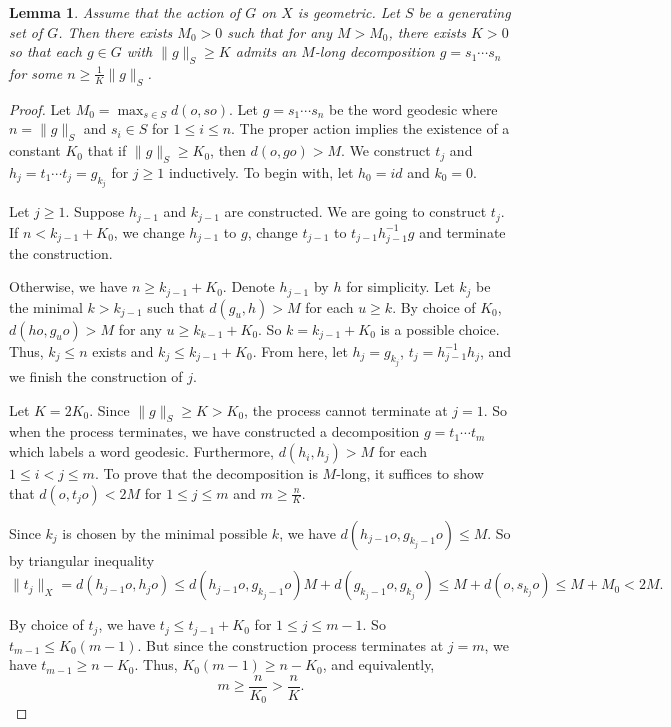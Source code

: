 \documentclass{amsart}
\numberwithin{thm}{section}
\numberwithin{figure}{section}
\newtheorem{lem}[thm]{Lemma}
\theoremstyle{definition}
\theoremstyle{definition}
\theoremstyle{remark}
\numberwithin{equation}{section}
\theoremstyle{plain}
\begin{document}
\begin{lem}\label{longDecExist} 
	Assume that the action of $G$ on $X$ is geometric. Let $S$ be a generating set of $G$. Then there exists $M_0>0$ such that for any $M>M_0$, there exists $K > 0$ so that each $g\in G$ with $\|g\|_S\ge K$ admits an $M$-long decomposition $g = s_1 \cdots s_n$ for some $n\ge \frac{1}{K}\|g\|_S$.      
\end{lem}
\begin{proof}
	Let $M_0 = \max_{s\in S} d(o, so)$.
	Let $g = s_1 \cdots s_n$ be the word geodesic where $n = \|g\|_S$ and $s_i\in S$ for $1\le i\le n$. 
	The proper action implies the existence of a constant $K_0$ that if $\|g\|_S \ge K_0$, then $d(o, go) > M$. We construct $t_j$ and $h_j = t_1 \cdots t_j = g_{k_j}$ for $j\ge 1$ inductively. To begin with, let $h_0 = id$ and $k_0=0$.
	
	Let $j\ge 1$. Suppose $h_{j-1}$ and $k_{j-1}$ are constructed. We are going to construct $t_j$. 
	If $n < k_{j-1} + K_0$, we change $h_{j-1}$ to $g$, change $t_{j-1}$ to $t_{j-1} h_{j-1}^{-1} g$ and terminate the construction.
	
	Otherwise, we have $n\ge k_{j-1} + K_0$. Denote $h_{j-1}$ by $h$ for simplicity. 
	Let $k_j$ be the minimal $k > k_{j-1}$ such that $d(g_u, h) > M$ for each $u\ge k$. By choice of $K_0$, $d(h o, g_u o) > M$ for any $u\ge k_{k-1} + K_0$. So $k = k_{j-1} + K_0$ is a possible choice. Thus, $k_j\le n$ exists and $k_j \le k_{j-1} + K_0$. From here, let $h_j = g_{k_j}$, $t_j = h_{j-1}^{-1} h_j$, and we finish the construction of $j$.
	
	Let $K = 2K_0$. Since $\|g\|_S \ge K > K_0$, the process cannot terminate at $j=1$. So when the process terminates, we have constructed a decomposition $g = t_1 \cdots t_m$ which labels a word geodesic. Furthermore, $d(h_i, h_j) > M$ for each $1\le i<j\le m$. To prove that the decomposition is $M$-long, it suffices to show that $d(o, t_j o) < 2 M$ for $1\le j\le m$ and $m\ge \frac{n}{K}$.
	
	Since $k_j$ is chosen by the minimal possible $k$, we have $d(h_{j-1} o, g_{k_j - 1} o) \le M$. So by triangular inequality $$\|t_j\|_X = d(h_{j-1} o, h_j o) \le d(h_{j-1} o, g_{k_j -1} o)M + d(g_{k_j -1} o, g_{k_j} o) \le M + d(o, s_{k_j} o) \le M + M_0 < 2 M.$$
	
	By choice of $t_j$, we have $t_j \le t_{j-1} + K_0$ for $1\le j\le m-1$. So $t_{m-1} \le K_0(m-1)$. But since the construction process terminates at $j = m$, we have $t_{m-1} \ge n - K_0$. Thus, $K_0(m-1) \ge n - K_0$, and equivalently, $$m\ge \frac{n}{K_0} > \frac{n}{K}.$$
\end{proof}
\fi
\end{document}
